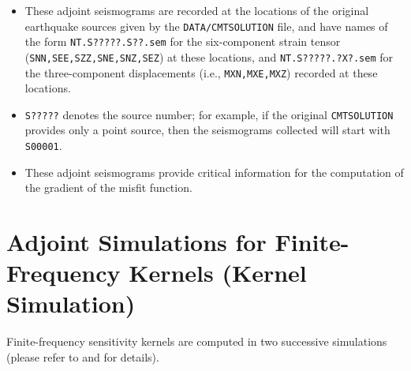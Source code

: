 \documentclass[oneside,english]{book}
\begin{document}
\begin{enumerate}
\begin{itemize}
\item These adjoint seismograms are recorded at the locations of the original
earthquake sources given by the \texttt{DATA/CMTSOLUTION} file, and
have names of the form \texttt{NT.S?????.S??.sem} for the six-component
strain tensor (\texttt{SNN,SEE,SZZ,SNE,SNZ,SEZ}) at these locations,
and \texttt{NT.S?????.?X?.sem} for the three-component displacements
(i.e., \texttt{MXN,MXE,MXZ}) recorded at these locations.
\item \texttt{S?????} denotes the source number; for example, if the original
\texttt{CMTSOLUTION} provides only a point source, then the seismograms
collected will start with \texttt{S00001}.
\item These adjoint seismograms provide critical information for the computation
of the gradient of the misfit function.
\end{itemize}
\end{enumerate}

\section{\label{sec:Adjoint-simulation-finite}Adjoint Simulations for Finite-Frequency
Kernels (Kernel Simulation)}

Finite-frequency sensitivity kernels are computed in two successive
simulations (please refer to \citet{LiTr06} and \citet{TrKoLi08} for details).
\end{document}
